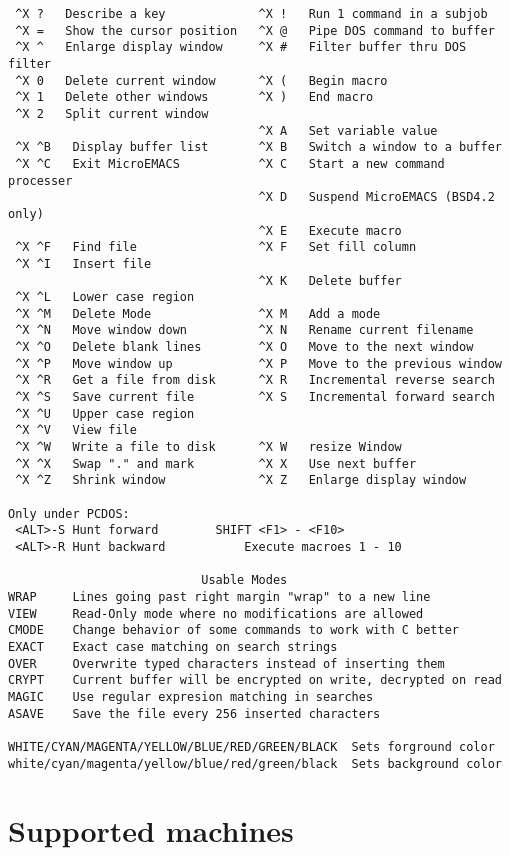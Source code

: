 \begin{verbatim}
 ^X ?   Describe a key             ^X !   Run 1 command in a subjob
 ^X =   Show the cursor position   ^X @   Pipe DOS command to buffer
 ^X ^   Enlarge display window     ^X #   Filter buffer thru DOS filter
 ^X 0   Delete current window      ^X (   Begin macro
 ^X 1   Delete other windows       ^X )   End macro
 ^X 2   Split current window
                                   ^X A   Set variable value
 ^X ^B   Display buffer list       ^X B   Switch a window to a buffer
 ^X ^C   Exit MicroEMACS           ^X C   Start a new command processer
                                   ^X D   Suspend MicroEMACS (BSD4.2 only)
                                   ^X E   Execute macro
 ^X ^F   Find file                 ^X F   Set fill column
 ^X ^I   Insert file
                                   ^X K   Delete buffer
 ^X ^L   Lower case region
 ^X ^M   Delete Mode               ^X M   Add a mode
 ^X ^N   Move window down          ^X N   Rename current filename
 ^X ^O   Delete blank lines        ^X O   Move to the next window
 ^X ^P   Move window up            ^X P   Move to the previous window
 ^X ^R   Get a file from disk      ^X R   Incremental reverse search
 ^X ^S   Save current file         ^X S   Incremental forward search
 ^X ^U   Upper case region
 ^X ^V   View file
 ^X ^W   Write a file to disk      ^X W   resize Window
 ^X ^X   Swap "." and mark         ^X X   Use next buffer
 ^X ^Z   Shrink window             ^X Z   Enlarge display window

Only under PCDOS:
 <ALT>-S Hunt forward        SHIFT <F1> - <F10>
 <ALT>-R Hunt backward           Execute macroes 1 - 10

                           Usable Modes
WRAP     Lines going past right margin "wrap" to a new line
VIEW     Read-Only mode where no modifications are allowed
CMODE    Change behavior of some commands to work with C better
EXACT    Exact case matching on search strings
OVER     Overwrite typed characters instead of inserting them
CRYPT    Current buffer will be encrypted on write, decrypted on read
MAGIC    Use regular expresion matching in searches
ASAVE    Save the file every 256 inserted characters

WHITE/CYAN/MAGENTA/YELLOW/BLUE/RED/GREEN/BLACK  Sets forground color
white/cyan/magenta/yellow/blue/red/green/black  Sets background color
\end{verbatim}
\chapter{Supported machines}

